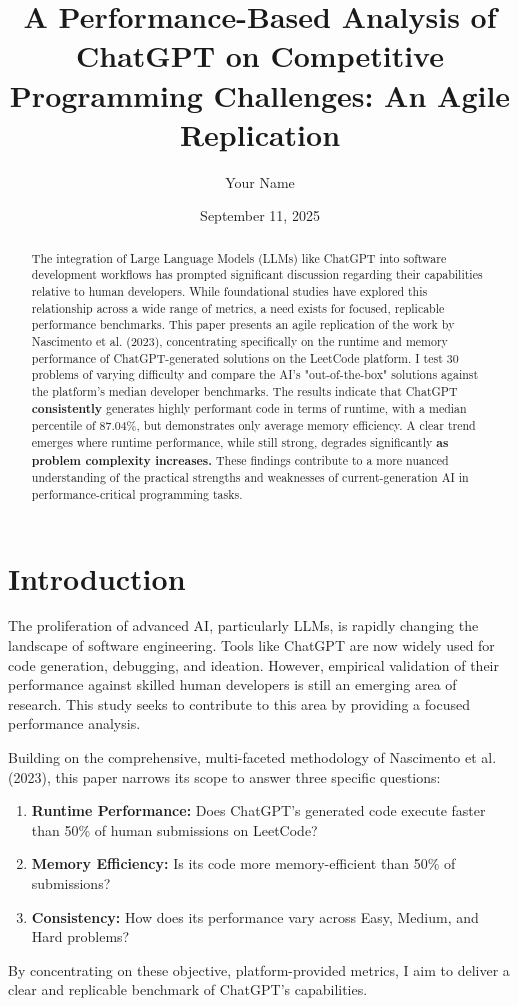 \documentclass[12pt, a4paper]{article}
\title{A Performance-Based Analysis of ChatGPT on Competitive Programming Challenges: An Agile Replication}
\author{Your Name}
\date{September 11, 2025}
\begin{document}
\maketitle

\begin{abstract}
The integration of Large Language Models (LLMs) like ChatGPT into software development workflows has prompted significant discussion regarding their capabilities relative to human developers. While foundational studies have explored this relationship across a wide range of metrics, a need exists for focused, replicable performance benchmarks. This paper presents an agile replication of the work by Nascimento et al. (2023), concentrating specifically on the runtime and memory performance of ChatGPT-generated solutions on the LeetCode platform. I test 30 problems of varying difficulty and compare the AI's "out-of-the-box" solutions against the platform's median developer benchmarks. The results indicate that ChatGPT \textbf{consistently} generates highly performant code in terms of runtime, with a median percentile of 87.04\%, but demonstrates only average memory efficiency. A clear trend emerges where runtime performance, while still strong, degrades significantly \textbf{as problem complexity increases.} These findings contribute to a more nuanced understanding of the practical strengths and weaknesses of current-generation AI in performance-critical programming tasks.
\end{abstract}

\section{Introduction}

The proliferation of advanced AI, particularly LLMs, is rapidly changing the landscape of software engineering. Tools like ChatGPT are now widely used for code generation, debugging, and ideation. However, empirical validation of their performance against skilled human developers is still an emerging area of research. This study seeks to contribute to this area by providing a focused performance analysis.

Building on the comprehensive, multi-faceted methodology of Nascimento et al. (2023), this paper narrows its scope to answer three specific questions:
\begin{enumerate}
    \item \textbf{Runtime Performance:} Does ChatGPT's generated code execute faster than 50\% of human submissions on LeetCode?
    \item \textbf{Memory Efficiency:} Is its code more memory-efficient than 50\% of submissions?
    \item \textbf{Consistency:} How does its performance vary across Easy, Medium, and Hard problems?
\end{enumerate}
By concentrating on these objective, platform-provided metrics, I aim to deliver a clear and replicable benchmark of ChatGPT's capabilities.
\end{document}
